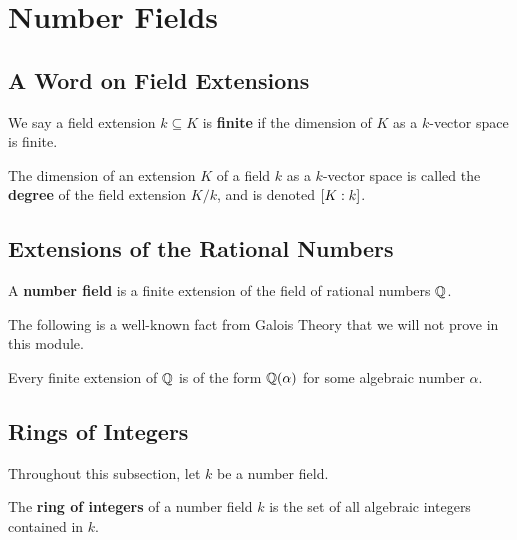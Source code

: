 \section{Number Fields}

\subsection{A Word on Field Extensions}

\begin{boxdefinition}
    We say a field extension $k \subseteq K$ is \textbf{finite} if the dimension of $K$ as a $k$-vector space is finite.
\end{boxdefinition}

\begin{boxdefinition}
    The dimension of an extension $K$ of a field $k$ as a $k$-vector space is called the \textbf{degree} of the field extension $K/k$, and is denoted $\left[ K : k \right]$.
\end{boxdefinition}

\subsection{Extensions of the Rational Numbers}

\begin{boxdefinition}
    A \textbf{number field} is a finite extension of the field of rational numbers $\mathbb{Q}$.
\end{boxdefinition}

The following is a well-known fact from Galois Theory that we will not prove in this module.

\begin{boxtheorem}\label{Ch2:Thm:Finite_Extensions_of_Q}
    Every finite extension of $\mathbb{Q}$ is of the form $\mathbb{Q}(\alpha)$ for some algebraic number $\alpha$.
\end{boxtheorem}

\subsection{Rings of Integers}

Throughout this subsection, let $k$ be a number field.

\begin{boxdefinition}
    The \textbf{ring of integers} of a number field $k$ is the set of all algebraic integers contained in $k$.
\end{boxdefinition}

